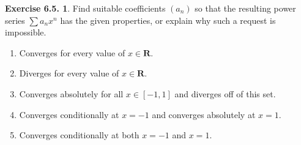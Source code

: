 \documentclass[12pt]{article}
\theoremstyle{definition}
\theoremstyle{exercise}
\newtheorem{exercise}{Exercise 6.5.}
\theoremstyle{solution}
\newcommand{\R}{\mathbf{R}}
\begin{document}
\begin{exercise}
\label{ex:2}
    Find suitable coefficients \( (a_n) \) so that the resulting power series \( \sum a_n x^n \) has the given properties, or explain why such a request is impossible.
    \begin{enumerate}
        \item Converges for every value of \( x \in \R \).

        \item Diverges for every value of \( x \in \R \).

        \item Converges absolutely for all \( x \in [-1, 1] \) and diverges off of this set.

        \item Converges conditionally at \( x = -1 \) and converges absolutely at \( x = 1 \).

        \item Converges conditionally at both \( x = -1 \) and \( x = 1 \).
    \end{enumerate}
\end{exercise}
\end{document}
